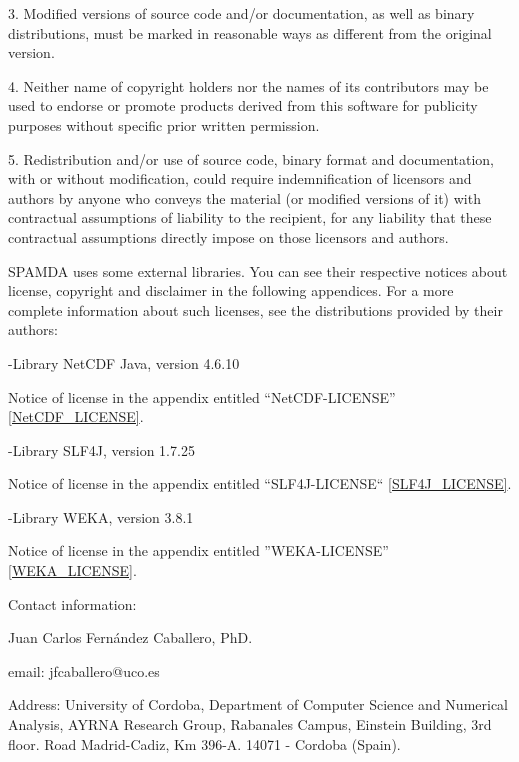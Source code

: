 3. Modified versions of source code and/or documentation, as well as binary
distributions, must be marked in reasonable ways as different from the original version.

4. Neither name of copyright holders nor the names of its contributors may be used
to endorse or promote products derived from this software for publicity purposes
without specific prior written permission.

5. Redistribution and/or use of source code, binary format and documentation,
with or without modification, could require indemnification of licensors
and authors by anyone who conveys the material (or modified versions of it)
with contractual assumptions of liability to the recipient, for any liability
that these contractual assumptions directly impose on those licensors and authors.

SPAMDA uses some external libraries. You can see their respective notices about license,
copyright and disclaimer in the following appendices. For a more complete information about
such licenses, see the distributions provided by their authors:

-Library NetCDF Java, version 4.6.10

\hspace{0.75cm}Notice of license in the appendix entitled ``NetCDF-LICENSE'' \ref{NetCDF_LICENSE}.

-Library SLF4J, version 1.7.25

\hspace{0.75cm}Notice of license in the appendix entitled ``SLF4J-LICENSE`` \ref{SLF4J_LICENSE}.

-Library WEKA, version 3.8.1

\hspace{0.75cm}Notice of license in the appendix entitled ''WEKA-LICENSE'' \ref{WEKA_LICENSE}.


Contact information:

Juan Carlos Fernández Caballero, PhD.

email: jfcaballero@uco.es

Address: University of Cordoba, Department of Computer Science
and Numerical Analysis, AYRNA Research Group, Rabanales Campus,
Einstein Building, 3rd floor. Road Madrid-Cadiz, Km 396-A.
14071 - Cordoba (Spain).